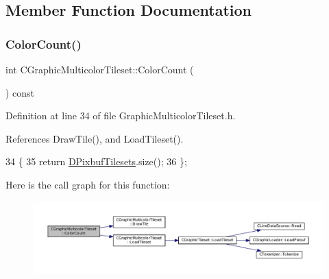 \subsection{Member Function Documentation}
\hypertarget{classCGraphicMulticolorTileset_abde63a1cef8d3eaeafe5c86f31ab9cae}{}\label{classCGraphicMulticolorTileset_abde63a1cef8d3eaeafe5c86f31ab9cae} 
\subsubsection{\texorpdfstring{Color\+Count()}{ColorCount()}}
{\footnotesize\ttfamily int C\+Graphic\+Multicolor\+Tileset\+::\+Color\+Count (\begin{DoxyParamCaption}{ }\end{DoxyParamCaption}) const\hspace{0.3cm}{\ttfamily [inline]}}



Definition at line 34 of file Graphic\+Multicolor\+Tileset.\+h.



References Draw\+Tile(), and Load\+Tileset().


\begin{DoxyCode}
34                               \{
35             \textcolor{keywordflow}{return} \hyperlink{classCGraphicMulticolorTileset_a30809d113b0f314944425a3c8f21408c}{DPixbufTilesets}.size();  
36         \};
\end{DoxyCode}
Here is the call graph for this function\+:\nopagebreak
\begin{figure}[H]
\begin{center}
\leavevmode
\includegraphics[width=350pt]{classCGraphicMulticolorTileset_abde63a1cef8d3eaeafe5c86f31ab9cae_cgraph}
\end{center}
\end{figure}
\hypertarget{classCGraphicMulticolorTileset_a17ee648ac82c48079a1853dc8a10365a}{}\label{classCGraphicMulticolorTileset_a17ee648ac82c48079a1853dc8a10365a} 
